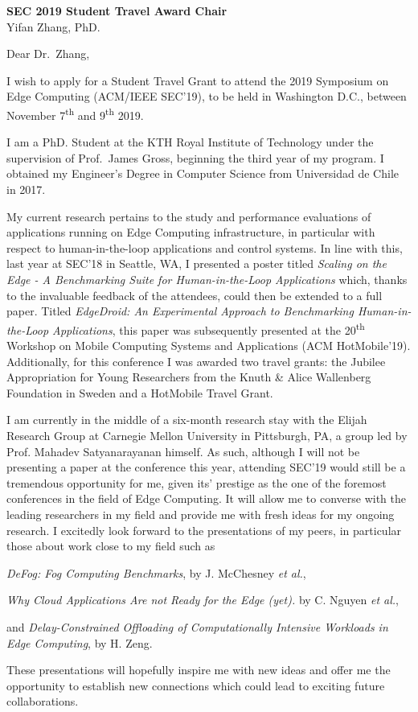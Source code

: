 \documentclass[english, 11pt]{kthletter}
\date{Stockholm, \today}
\begin{document}
\begin{letter}%
  {\textbf{SEC 2019 Student Travel Award Chair}\\Yifan Zhang, PhD.}
\opening{Dear Dr.~Zhang,}

I wish to apply for a Student Travel Grant to attend the 2019 Symposium on Edge Computing (ACM/IEEE SEC'19), to be held in Washington D.C., between November 7\textsuperscript{th} and 9\textsuperscript{th} 2019.

I am a PhD. Student at the KTH Royal Institute of Technology under the supervision of Prof.\ James Gross, beginning the third year of my program.
I obtained my Engineer's Degree in Computer Science from Universidad de Chile in 2017.

My current research pertains to the study and performance evaluations of applications running on Edge Computing infrastructure, in particular with respect to human-in-the-loop applications and control systems. In line with this, last year at SEC'18 in Seattle, WA, I presented a poster titled \emph{Scaling on the Edge - A Benchmarking Suite for Human-in-the-Loop Applications} which, thanks to the invaluable feedback of the attendees, could then be extended to a full paper. Titled \emph{EdgeDroid: An Experimental Approach to Benchmarking Human-in-the-Loop Applications}, this paper was subsequently presented at the 20\textsuperscript{th} Workshop on Mobile Computing Systems and Applications (ACM HotMobile'19). Additionally, for this conference I was awarded two travel grants: the Jubilee Appropriation for Young Researchers from the Knuth \& Alice Wallenberg Foundation in Sweden and a HotMobile Travel Grant. 

I am currently in the middle of a six-month research stay with the Elijah Research Group at Carnegie Mellon University in Pittsburgh, PA, a group led by Prof. Mahadev Satyanarayanan himself. As such, although I will not be presenting a paper at the conference this year, attending SEC'19 would still be a tremendous opportunity for me, given its' prestige as the one of the foremost conferences in the field of Edge Computing. It will allow me to converse with the leading researchers in my field and provide me with fresh ideas for my ongoing research. I excitedly look forward to the presentations of my peers, in particular those about work close to my field such as 
\begin{enumerate*}[label={(\arabic*)}]
    \item \emph{DeFog: Fog Computing Benchmarks}, by J. McChesney \emph{et al.},
    \item \emph{Why Cloud Applications Are not Ready for the Edge (yet).} by C. Nguyen \emph{et al.},
    \item and \emph{Delay-Constrained Offloading of Computationally Intensive Workloads in Edge Computing}, by H. Zeng.
\end{enumerate*}
These presentations will hopefully inspire me with new ideas and offer me the opportunity to establish new connections which could lead to exciting future collaborations.


\end{letter}
\end{document}
